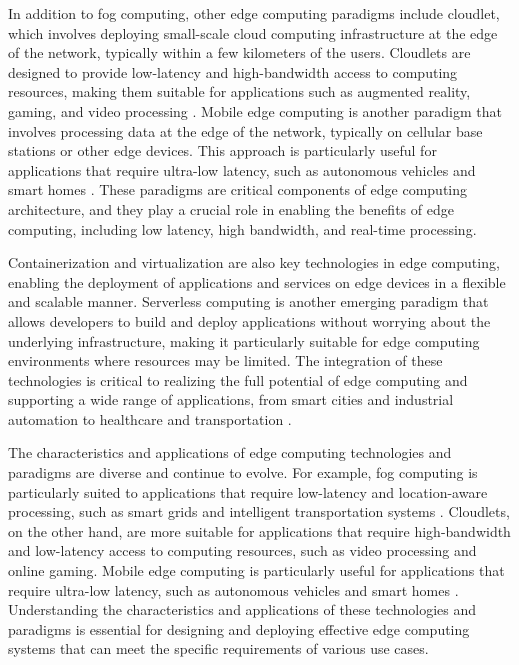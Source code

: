 \documentclass[11pt]{article}
\begin{document}
In addition to fog computing, other edge computing paradigms include cloudlet, which involves deploying small-scale cloud computing infrastructure at the edge of the network, typically within a few kilometers of the users. Cloudlets are designed to provide low-latency and high-bandwidth access to computing resources, making them suitable for applications such as augmented reality, gaming, and video processing \cite{ref3}. Mobile edge computing is another paradigm that involves processing data at the edge of the network, typically on cellular base stations or other edge devices. This approach is particularly useful for applications that require ultra-low latency, such as autonomous vehicles and smart homes \cite{ref1}. These paradigms are critical components of edge computing architecture, and they play a crucial role in enabling the benefits of edge computing, including low latency, high bandwidth, and real-time processing.

Containerization \cite{ref31} and virtualization \cite{ref32} are also key technologies in edge computing, enabling the deployment of applications and services on edge devices in a flexible and scalable manner. Serverless computing \cite{ref33} is another emerging paradigm that allows developers to build and deploy applications without worrying about the underlying infrastructure, making it particularly suitable for edge computing environments where resources may be limited. The integration of these technologies is critical to realizing the full potential of edge computing and supporting a wide range of applications, from smart cities and industrial automation to healthcare and transportation \cite{ref2}.

The characteristics and applications of edge computing technologies and paradigms are diverse and continue to evolve. For example, fog computing is particularly suited to applications that require low-latency and location-aware processing, such as smart grids and intelligent transportation systems \cite{ref30}. Cloudlets, on the other hand, are more suitable for applications that require high-bandwidth and low-latency access to computing resources, such as video processing and online gaming. Mobile edge computing is particularly useful for applications that require ultra-low latency, such as autonomous vehicles and smart homes \cite{ref1}. Understanding the characteristics and applications of these technologies and paradigms is essential for designing and deploying effective edge computing systems that can meet the specific requirements of various use cases.
\end{document}
